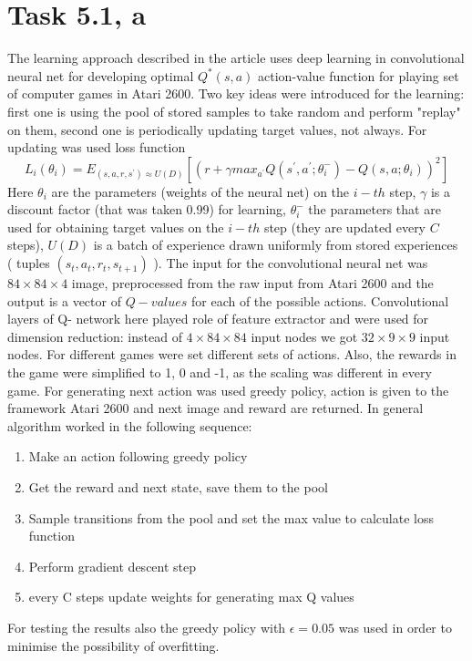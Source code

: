 \documentclass[english]{scrartcl}
\begin{document}
\section*{Task 5.1, a}
The learning approach described in the article uses deep learning in convolutional neural net for developing optimal $Q^{*}(s,a)$ action-value function for playing set of computer games in Atari 2600. Two key ideas were introduced for the learning: first one is using the pool of stored samples to take random and perform "replay" on them, second one is periodically updating target values, not always. For updating was used loss function $$L_{i}(\theta_{i})=E_{(s,a,r,s^{\prime})\approx U(D)}[(r+\gamma max_{a^{\prime}} Q(s^{\prime},a^{\prime};\theta_{i}^{-})-Q(s,a;\theta_{i}))^{2}]$$
Here $\theta_{i}$ are the parameters (weights of the neural net) on the $i-th$ step, $\gamma$ is a discount factor (that was taken 0.99) for learning, $\theta_{i}^{-}$ the parameters that are used for obtaining target values on the $i-th$ step (they are updated every $C$ steps), $U(D)$ is a batch of experience drawn uniformly from stored experiences ( tuples $(s_{t},a_{t},r_{t},s_{t+1})$ ).  The input for the convolutional neural net was $84\times84\times4$ image, preprocessed from the raw input from Atari 2600 and the output is a vector of $Q-values$ for each of the possible actions. Convolutional layers of Q- network here played role of feature extractor and were used for dimension reduction: instead of $4\times 84\times 84$ input nodes we got $32\times 9\times 9$ input nodes. For different games were set different sets of actions. Also, the rewards in the game were simplified to 1, 0 and -1, as the scaling was different in every game. For generating next action was used greedy policy, action is given to the framework Atari 2600 and next image and reward are returned. In general algorithm worked in the following sequence:
\begin{enumerate}
\item Make an action following greedy policy
\item Get the reward and next state, save them to the pool
\item Sample transitions from the pool and set the max value to calculate loss function
\item Perform gradient descent step
\item every C steps update weights for generating max Q values
\end{enumerate}
For testing the results also the greedy policy with $\epsilon = 0.05$ was used in order to minimise the possibility of overfitting.
\end{document}
